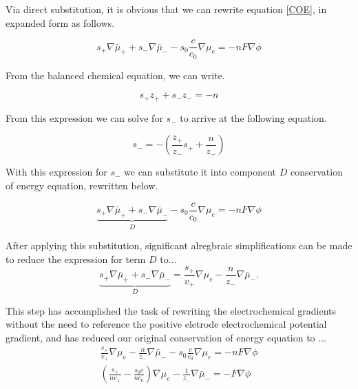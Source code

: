 \documentclass[lettersize,journal]{IEEEtran}
\begin{document}
\noindent Via direct substitution, it is obvious that we can rewrite equation \ref{COE}, in expanded form as follows.

\begin{equation}
s_{+} \nabla \bar{\mu}_{+}+s_{-} \nabla \bar{\mu}_{-}-s_{0} \frac{c}{c_{0}} \nabla \mu_{e}=-n F \nabla \phi
\end{equation}

\noindent From the balanced chemical equation, we can write.

\begin{equation}
s_{+} z_{+}+s_{-} z_{-} =-n
\end{equation}

\noindent From this expression we can solve for $s_{-} $ to arrive at the following equation.

\begin{equation}\label{signed_stoich_coef}
    s_{-} =-\left(\frac{z_{+}}{z_{-}} s_{+}+\frac{n}{z_{-}}\right)
\end{equation}

\noindent With this expression for $s_{-} $ we can substitute it into component $D$ conservation of energy equation, rewritten below.


\begin{equation}
\underbrace{s_{+} \nabla \bar{\mu}_{+}+s_{-} \nabla \bar{\mu}_{-}}_{D}-s_{0} \frac{c}{c_{0}} \nabla \mu_{e}=-n F \nabla \phi
\end{equation}

\noindent After applying this substitution, significant alregbraic simplifications can be made to reduce the expression for term $D$ to...
\begin{equation}
\underbrace{s_{+} \nabla \bar{\mu}_{+}+s_{-} \nabla \bar{\mu}_{-}}_{D} =\frac{s_{+}}{v_{+}} \nabla \mu_{e}-\frac{n}{z_{-}} \nabla \bar{\mu}_{-} .
\end{equation}

\noindent This step has accomplished the task of rewriting the electrochemical gradients without the need to reference the positive eletrode electrochemical potential gradient, and has reduced our original conservation of energy equation to ...
\begin{equation}\label{grad_mu_e_n_grad_mu_n}
\begin{array}{l}
\frac{s_{+}}{v_{+}} \nabla \mu_{e}-\frac{n}{z_{-}} \nabla \bar{\mu}_{-}-s_{0} \frac{c}{c_{0}} \nabla \mu_{e}=-n F \nabla \phi \\
\left(\frac{s_{+}}{n v_{+}}-\frac{s_{0} c}{n c_{0}}\right) \nabla \mu_{e}-\frac{1}{z_{-}} \nabla \bar{\mu}_{-}=-F \nabla \phi
\end{array}
\end{equation}
\end{document}
